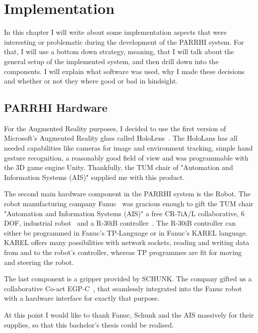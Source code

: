 \chapter{Implementation}\label{Chap:Implementation}

In this chapter I will write about some implementation aspects that were interesting or problematic during the development of the PARRHI system. For that, I will use a bottom down strategy, meaning, that I will talk about the general setup of the implemented system, and then drill down into the components. I will explain what software was used, why I made these decisions and whether or not they where good or bad in hindsight.

\section{PARRHI Hardware}
For the Augmented Reality purposes, I decided to use the first version of Microsoft's Augmented Reality glass called HoloLens~\cite{HoloLens}. The HoloLans has all needed capabilities like cameras for image and environment tracking, simple hand gesture recognition, a reasonably good field of view and was programmable with the 3D game engine Unity. Thankfully, the TUM chair of "Automation and Information Systems (AIS)" supplied me with this product.

The second main hardware component in the PARRHI system is the Robot. The robot manufacturing company Fanuc~\cite{Fanuc} was gracious enough to gift the TUM chair "Automation and Information Systems (AIS)" a free CR-7iA/L collaborative, 6 DOF, industrial robot~\cite{FanucCR7} and a R-30iB controller~\cite{FanucR30iB}. The R-30iB controller can either be programmed in Fanuc's TP-Language or in Fanuc's KAREL language. KAREL offers many possibilities with network sockets, reading and writing data from and to the robot's controller, whereas TP programmes are fit for moving and steering the robot.

The last component is a gripper provided by SCHUNK. The company gifted us a collaborative Co-act EGP-C~\cite{SchunkGripper}, that seamlessly integrated into the Fanuc robot with a hardware interface for exactly that purpose. 

At this point I would like to thank Fanuc, Schunk and the AIS massively for their supplies, so that this bachelor's thesis could be realised.

